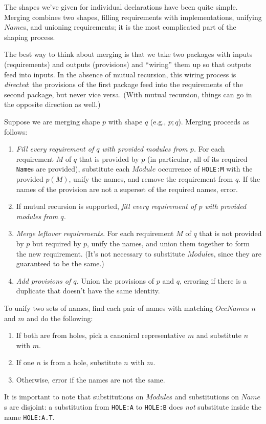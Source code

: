 \documentclass{article}
\newcommand{\I}[1]{\ensuremath{\mathit{#1}}}
\begin{document}
The shapes we've given for individual declarations have been quite
simple.  Merging combines two shapes, filling requirements with
implementations, unifying \I{Name}s, and unioning requirements; it is
the most complicated part of the shaping process.

The best way to think about merging is that we take two packages with
inputs (requirements) and outputs (provisions) and ``wiring'' them up so
that outputs feed into inputs.  In the absence
of mutual recursion, this wiring process is \emph{directed}: the provisions
of the first package feed into the requirements of the second package,
but never vice versa.  (With mutual recursion, things can go in the opposite
direction as well.)

Suppose we are merging shape $p$ with shape $q$ (e.g., $p; q$).  Merging
proceeds as follows:

\begin{enumerate}
    \item \emph{Fill every requirement of $q$ with provided modules from
        $p$.} For each requirement $M$ of $q$ that is provided by $p$ (in particular,
        all of its required \verb|Name|s are provided),
        substitute each \I{Module} occurrence of \verb|HOLE:M| with the
        provided $p(M)$, unify the names, and remove the requirement from $q$.
        If the names of the provision are not a superset of the required names, error.
    \item If mutual recursion is supported, \emph{fill every requirement of $p$ with provided modules from $q$.}
    \item \emph{Merge leftover requirements.}  For each requirement $M$ of $q$ that is not
        provided by $p$ but required by $p$, unify the names, and union them together to form the new requirement.  (It's not
        necessary to substitute \I{Module}s, since they are guaranteed to be the same.)
    \item \emph{Add provisions of $q$.} Union the provisions of $p$ and $q$, erroring
        if there is a duplicate that doesn't have the same identity.
\end{enumerate}
%
To unify two sets of names, find each pair of names with matching \I{OccName}s $n$ and $m$ and do the following:

\begin{enumerate}
    \item If both are from holes, pick a canonical representative $m$ and substitute $n$ with $m$.
    \item If one $n$ is from a hole, substitute $n$ with $m$.
    \item Otherwise, error if the names are not the same.
\end{enumerate}
%
It is important to note that substitutions on \I{Module}s and substitutions on
\I{Name}s are disjoint: a substitution from \verb|HOLE:A| to \verb|HOLE:B|
does \emph{not} substitute inside the name \verb|HOLE:A.T|.
\end{document}
